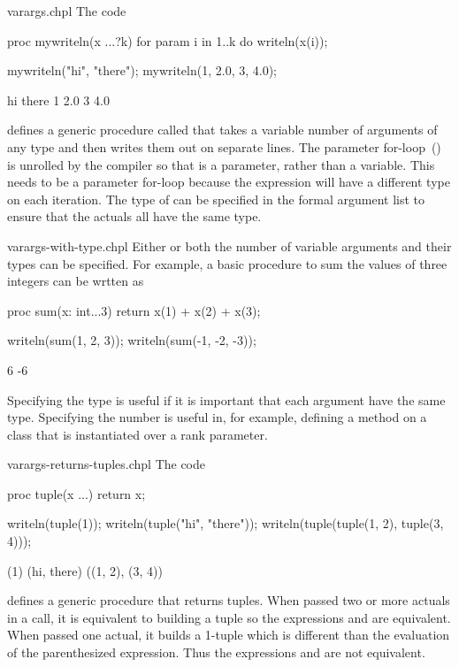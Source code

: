 \begin{chapelexample}{varargs.chpl}
The code
\begin{chapel}
proc mywriteln(x ...?k) {
  for param i in 1..k do
    writeln(x(i));
}
\end{chapel}
\begin{chapelpost}
mywriteln("hi", "there");
mywriteln(1, 2.0, 3, 4.0);
\end{chapelpost}
\begin{chapeloutput}
hi
there
1
2.0
3
4.0
\end{chapeloutput}
defines a generic procedure called  that takes a
variable number of arguments of any type and then writes them out on
separate lines.  The parameter for-loop~()
is unrolled by the compiler so that  is a parameter, rather
than a variable.  This needs to be a parameter for-loop because the
expression  will have a different type on each iteration.
The type of  can be specified in the formal argument list to
ensure that the actuals all have the same type.
\end{chapelexample}

\begin{chapelexample}{varargs-with-type.chpl}
Either or both the number of variable arguments and their types can be
specified.  For example, a basic procedure to sum the values of three
integers can be wrtten as
\begin{chapel}
proc sum(x: int...3) return x(1) + x(2) + x(3);
\end{chapel}
\begin{chapelpost}
writeln(sum(1, 2, 3));
writeln(sum(-1, -2, -3));
\end{chapelpost}
\begin{chapeloutput}
6
-6
\end{chapeloutput}
Specifying the type is useful if it is important that each argument
have the same type.  Specifying the number is useful in, for example,
defining a method on a class that is instantiated over a rank
parameter.
\end{chapelexample}

\begin{chapelexample}{varargs-returns-tuples.chpl}
The code
\begin{chapel}
proc tuple(x ...) return x;
\end{chapel}
\begin{chapelpost}
writeln(tuple(1));
writeln(tuple("hi", "there"));
writeln(tuple(tuple(1, 2), tuple(3, 4)));
\end{chapelpost}
\begin{chapeloutput}
(1)
(hi, there)
((1, 2), (3, 4))
\end{chapeloutput}
defines a generic procedure that returns tuples.  When passed two or
more actuals in a call, it is equivalent to building a tuple so the
expressions  and  are equivalent.  When
passed one actual, it builds a 1-tuple which is different than the
evaluation of the parenthesized expression.  Thus the
expressions  and  are not equivalent.
\end{chapelexample}



